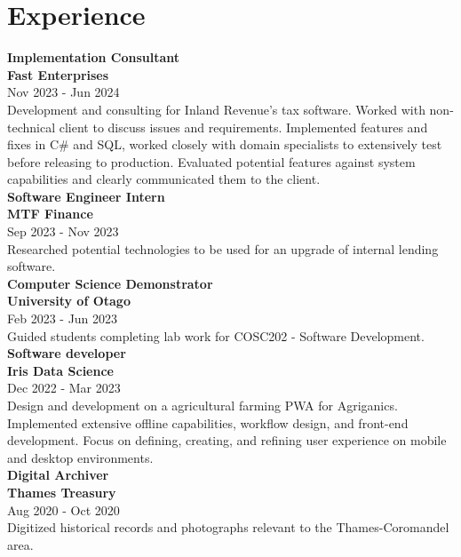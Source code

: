 \documentclass[lighthipster]{simplehipstercv}
\begin{document}
    \begin{minipage}[t]{1\textwidth}
    \section*{Experience}
    
    \textbf{Implementation Consultant}\\
    \textbf{Fast Enterprises}\\
    Nov 2023 - Jun 2024\\
    Development and consulting for Inland Revenue's tax software. 
        Worked with non-technical client to discuss issues and requirements. 
        Implemented features and fixes in C\# and SQL, worked closely with domain specialists to extensively test before releasing to production.
        Evaluated potential features against system capabilities and clearly communicated them to the client. \\
    
    \textbf{Software Engineer Intern}\\
    \textbf{MTF Finance}\\
    Sep 2023 - Nov 2023\\
    Researched potential technologies to be used for an upgrade of internal lending software.\\
    
    \textbf{Computer Science Demonstrator}\\
    \textbf{University of Otago}\\
    Feb 2023 - Jun 2023\\
    Guided students completing lab work for COSC202 - Software Development.\\
    
    \textbf{Software developer}\\
    \textbf{Iris Data Science}\\
    Dec 2022 - Mar 2023\\
    Design and development on a agricultural farming PWA for Agriganics. 
        Implemented extensive offline capabilities, workflow design, and front-end development. 
        Focus on defining, creating, and refining user experience on mobile and desktop environments.\\
    
    \textbf{Digital Archiver}\\
    \textbf{Thames Treasury}\\
    Aug 2020 - Oct 2020\\
    Digitized historical records and photographs relevant to the Thames-Coromandel area.\\
    

\end{minipage}
\end{document}
